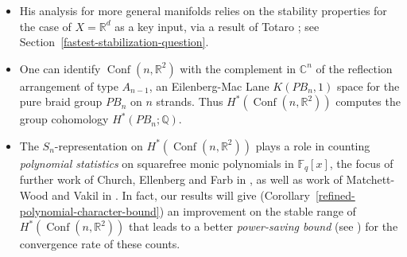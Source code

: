 \documentclass[12pt]{amsart}
\theoremstyle{plain}
\theoremstyle{definition}
\begin{document}
\begin{itemize}
\item
His analysis for more general manifolds relies on the 
stability properties for the case of $X = {{\mathbb{R}}}^d$ as a key input, 
via a result of Totaro \cite{Totaro};
see Section~\ref{fastest-stabilization-question}.

\item
One can identify ${{\operatorname{Conf}}}(n,{{\mathbb{R}}}^2)$ with
the complement in ${{\mathbb C}}^n$ of the reflection
arrangement of type $A_{n-1}$,
an Eilenberg-Mac Lane $K(PB_n,1)$ space for the 
pure braid group $PB_n$ on $n$ strands.  Thus
$H^*({{\operatorname{Conf}}}(n,{{\mathbb{R}}}^2))$ computes the group cohomology $H^*(PB_n;{{\mathbb Q}})$.
\item
The $S_n$-representation on $H^*({{\operatorname{Conf}}}(n,{{\mathbb{R}}}^2))$
plays a role in counting {\it polynomial statistics} 
on squarefree monic polynomials
in ${{\mathbb{F}}}_q[x]$, the focus of further work of 
Church, Ellenberg and Farb  in \cite{CEF2}, as well as work of 
Matchett-Wood and Vakil in \cite{Vakil-M.Wood}.
In fact, our results will give 
(Corollary~\ref{refined-polynomial-character-bound})
an improvement on the stable range of 
$H^*({{\operatorname{Conf}}}(n,{{\mathbb{R}}}^2))$ that leads to a better {\it power-saving bound}
(see \cite[\S 1.1]{CEF2}) for the convergence rate of these counts.
\end{itemize}
\end{document}
